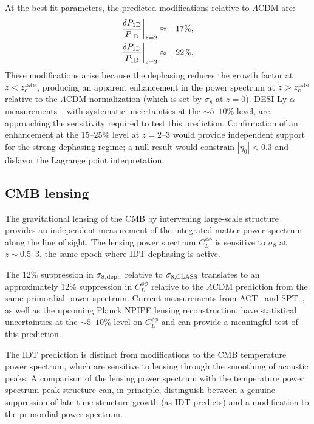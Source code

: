 \documentclass[aps,prd,twocolumn,superscriptaddress,nofootinbib]{revtex4-2}
\newcommand{\zc}{z_{\rm c}}
\newcommand{\etaz}{\eta_0}
\begin{document}
At the best-fit parameters, the predicted modifications relative to
$\Lambda$CDM are:
\begin{align}
\frac{\delta P_{\rm 1D}}{P_{\rm 1D}}\bigg|_{z=2} &\approx +17\%,
\label{eq:lyalpha_z2} \\
\frac{\delta P_{\rm 1D}}{P_{\rm 1D}}\bigg|_{z=3} &\approx +22\%.
\label{eq:lyalpha_z3}
\end{align}
These modifications arise because the dephasing reduces the growth
factor at $z < \zc^{\rm late}$, producing an apparent enhancement in
the power spectrum at $z > \zc^{\rm late}$ relative to the
$\Lambda$CDM normalization (which is set by $\sigma_8$ at $z = 0$).
DESI Ly-$\alpha$ measurements~\cite{DESI_LyA2024}, with systematic
uncertainties at the $\sim 5$--$10\%$ level, are approaching the
sensitivity required to test this prediction. Confirmation of an
enhancement at the $15$--$25\%$ level at $z = 2$--$3$ would provide
independent support for the strong-dephasing regime; a null result
would constrain $|\etaz| < 0.3$ and disfavor the Lagrange point
interpretation.

\subsection{CMB lensing}
\label{sec:cmb_lensing}

The gravitational lensing of the CMB by intervening large-scale
structure provides an independent measurement of the integrated
matter power spectrum along the line of sight. The lensing power
spectrum $C_L^{\phi\phi}$ is sensitive to $\sigma_8$ at
$z \sim 0.5$--$3$, the same epoch where IDT dephasing is active.

The $12\%$ suppression in $\sigma_{8,\rm deph}$ relative to
$\sigma_{8,\rm CLASS}$ translates to an approximately $12\%$
suppression in $C_L^{\phi\phi}$ relative to the $\Lambda$CDM
prediction from the same primordial power spectrum. Current
measurements from ACT~\cite{ACT2024} and SPT~\cite{SPT2023}, as well
as the upcoming Planck NPIPE lensing reconstruction, have statistical
uncertainties at the $\sim 5$--$10\%$ level on $C_L^{\phi\phi}$ and
can provide a meaningful test of this prediction.

The IDT prediction is distinct from modifications to the CMB
temperature power spectrum, which are sensitive to lensing through the
smoothing of acoustic peaks. A comparison of the lensing power
spectrum with the temperature power spectrum peak structure can, in
principle, distinguish between a genuine suppression of late-time
structure growth (as IDT predicts) and a modification to the
primordial power spectrum.
\end{document}
